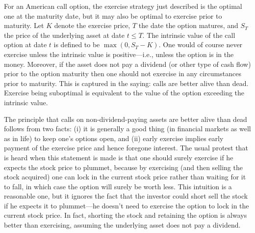 For an American call option, the exercise strategy just described is the optimal one at the maturity date, but it may also be optimal to exercise prior to maturity.    Let $K$ denote the exercise price, $T$ the date the option matures, and $S_T$ the price of the underlying asset at date $t \leq T$.  The intrinsic value  of the call option at date $t$ is defined to be $\max(0,S_T-K)$.  One would of course never exercise unless the intrinsic value is positive---i.e., unless the option is in the money.  Moreover, if the asset does not pay a dividend (or other type of cash flow) prior to the option maturity then one should not exercise in any circumstances prior to maturity.  This is captured in the saying:  calls are better alive than dead.  Exercise being suboptimal is equivalent  to the value of the option exceeding the intrinsic value.

The principle that calls on non-dividend-paying assets are better alive than dead follows from two facts: (i) it is generally a good thing (in financial markets as well as in life) to keep one's options open, and (ii) early exercise implies early payment of the exercise price and hence foregone interest.  The usual protest that is heard when this statement is made is that one should surely exercise if he expects the stock price to plummet, because by exercising (and then selling the stock acquired) one can lock in the current stock price rather than waiting for it to fall, in which case the option will surely be worth less.  This intuition is a reasonable one, but it ignores the fact that the investor could short sell the stock if he expects it to plummet---he doesn't need to exercise the option to lock in the current stock price.  In fact, shorting the stock and retaining the option is always better than exercising, assuming the underlying asset does not pay a dividend.  

